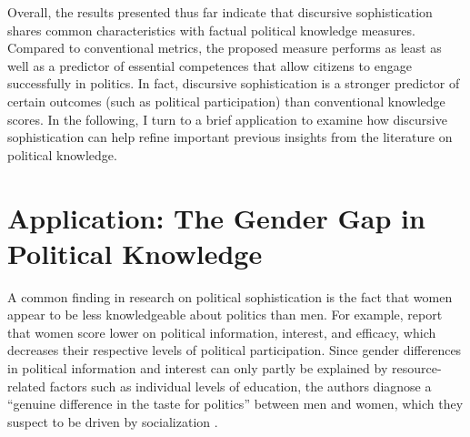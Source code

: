 \documentclass[12pt]{article}
\begin{document}
Overall, the results presented thus far indicate that discursive sophistication shares common characteristics with factual political knowledge measures. Compared to conventional metrics, the proposed measure performs as least as well as a predictor of essential competences that allow citizens to engage successfully in politics. In fact, discursive sophistication is a stronger predictor of certain outcomes (such as political participation) than conventional knowledge scores. In the following, I turn to a brief application to examine how discursive sophistication can help refine important previous insights from the literature on political knowledge.



\section*{Application: The Gender Gap in Political Knowledge}



A common finding in research on political sophistication is the fact that women appear to be less knowledgeable about politics than men. For example, \citet{verba1997knowing} report that women score lower on political information, interest, and efficacy, which decreases their respective levels of political participation. Since gender differences in political information and interest can only partly be explained by resource-related factors such as individual levels of education, the authors diagnose a ``genuine difference in the taste for politics'' between men and women, which they suspect to be driven by socialization \citep[see also][]{wolak2011roots}.
\end{document}
